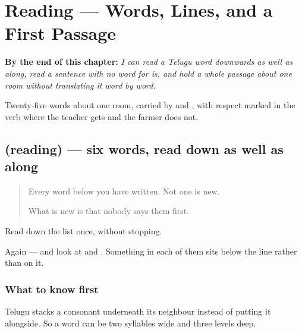 
\chapter{Reading — Words, Lines, and a First Passage}
\label{ch:te-modati-chadavu}

\begin{chapteropening}
\textbf{By the end of this chapter:} \emph{I can read a Telugu word downwards as well as along, read a sentence with no word for is, and hold a whole passage about one room without translating it word by word.}

Twenty-five words about one room, carried by  and , with respect marked in the verb where the teacher gets  and the farmer does not.
\end{chapteropening}

\section[(reading)]{(reading) — six words, read down as well as along}

\label{lesson:TE-C83-words}



\begin{quote}
Every word below you have written. Not one is new.

What is new is that nobody says them first.
\end{quote}

\begin{tcolorbox}[breakable,skin=enhanced,colback=orange!6,colframe=orange!45!black,boxrule=0.5pt,arc=1mm,left=6pt,right=6pt,top=4pt,bottom=4pt,fonttitle=\bfseries,title={Read this}]
\begin{quote}
     
\end{quote}

Read down the list once, without stopping.

Again — and look at \textbf{} and \textbf{}. Something in each of them sits below the line rather than on it.
\end{tcolorbox}

\subsection*{What to know first}
Telugu stacks a consonant underneath its neighbour instead of putting it alongside. So a word can be two syllables wide and three levels deep.

